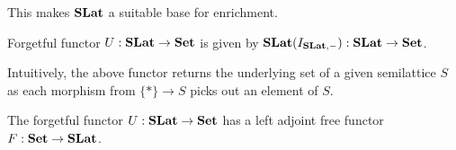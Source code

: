   This makes $\mathbf{SLat}$ a suitable base for enrichment.

  \begin{definition}
    Forgetful functor $U : \mathbf{SLat} \to \mathbf{Set}$ is given by $\mathbf{SLat}(I_{\mathbf{SLat}, -}) : \mathbf{SLat} \to \mathbf{Set}$.
    \end{definition}
    
    Intuitively, the above functor returns the underlying set of a given semilattice $S$ as each morphism from $\{*\} \to S$ picks out an element of $S$.
    
    \begin{proposition}
      The forgetful functor $U : \mathbf{SLat} \to \mathbf{Set}$ has a left adjoint free functor $F : \mathbf{Set} \to \mathbf{SLat}$.
    \end{proposition}
